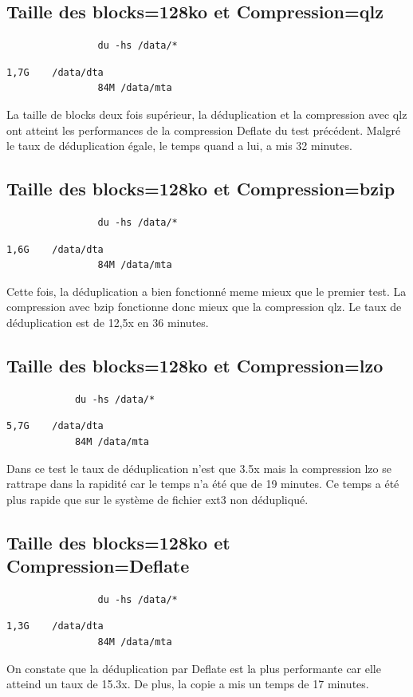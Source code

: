 \documentclass[a4paper]{report}
\begin{document}
		\subsection{Taille des blocks=128ko et Compression=qlz}
			
			\begin{lstlisting}
				du -hs /data/*
			\end{lstlisting}
			\begin{lstlisting}[backgroundcolor=\color{yellow}]
				1,7G	/data/dta
				84M	/data/mta
			\end{lstlisting}
			La taille de blocks deux fois supérieur, la déduplication et la compression avec qlz ont atteint les performances de la compression Deflate du test précédent. Malgré le taux de déduplication égale, le temps quand a lui, a mis 32 minutes.

		\subsection{Taille des blocks=128ko et Compression=bzip}
			\begin{lstlisting}
				du -hs /data/*
			\end{lstlisting}
			\begin{lstlisting}[backgroundcolor=\color{yellow}]
				1,6G	/data/dta
				84M	/data/mta
			\end{lstlisting}
			 Cette fois, la déduplication a bien fonctionné meme mieux que le premier test. La compression avec bzip fonctionne donc mieux que la compression qlz. Le taux de déduplication est de 12,5x en 36 minutes.\\

		\subsection{Taille des blocks=128ko et Compression=lzo}
		\begin{lstlisting}
			du -hs /data/*
		\end{lstlisting}
		\begin{lstlisting}[backgroundcolor=\color{yellow}]
			5,7G	/data/dta
			84M	/data/mta
		\end{lstlisting}
			Dans ce test le taux de déduplication n'est que 3.5x mais la compression lzo se rattrape dans la rapidité car le temps n'a été que de 19 minutes. Ce temps a été plus rapide que sur le système de fichier ext3 non dédupliqué.\\

		\subsection{Taille des blocks=128ko et Compression=Deflate}
			\begin{lstlisting}
				du -hs /data/*
			\end{lstlisting}
			\begin{lstlisting}[backgroundcolor=\color{yellow}]
				1,3G	/data/dta
				84M	/data/mta
			\end{lstlisting}
			On constate que la déduplication par Deflate est la plus performante car elle atteind un taux de 15.3x. De plus, la copie a mis un temps de 17 minutes.\\
\end{document}

